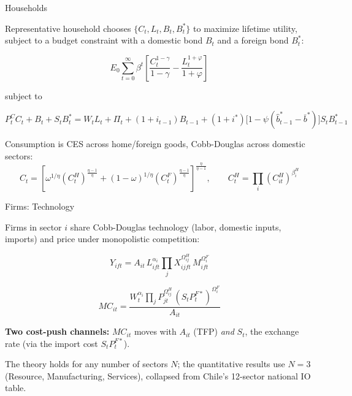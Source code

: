 \documentclass[aspectratio=43, 10pt]{beamer}
\begin{document}
\begin{frame}{Households}

\small

Representative household chooses $\{C_t,L_t,B_t,B_t^*\}$ to maximize lifetime utility, subject to a budget constraint with a domestic bond $B_t$ and a foreign bond $B_t^*$:

\[
E_0\sum_{t=0}^{\infty}\beta^t
\left[
\frac{C_t^{1-\gamma}}{1-\gamma}
-
\frac{L_t^{1+\varphi}}{1+\varphi}
\right]
\]

subject to 
\vspace{1pt}

\[
P_t^CC_t+B_t+S_tB_t^*=W_tL_t+\Pi_t+(1{+}i_{t-1})B_{t-1}+(1{+}i^*)\big[1-\psi(\hat b^*_{t-1}-\bar b^*)\big]S_tB_{t-1}^*
\]

\vspace{6pt}
Consumption is CES across home/foreign goods, Cobb-Douglas across domestic sectors:
\[
C_t=
\left[
\omega^{1/\eta}(C_t^H)^{\frac{\eta-1}{\eta}}
+
(1-\omega)^{1/\eta}(C_t^F)^{\frac{\eta-1}{\eta}}
\right]^{\frac{\eta}{\eta-1}},
\qquad
C_t^H=\prod_i(C_{it}^H)^{\beta_i^H}
\]

\end{frame}


\begin{frame}{Firms: Technology}

\small

Firms in sector $i$ share Cobb-Douglas technology (labor, domestic inputs, imports) and price under monopolistic competition:

\[
Y_{ift}=A_{it}\,L_{ift}^{\alpha_i}\prod_j X_{ijft}^{\Omega^H_{ij}}\,M_{ift}^{\Omega^F_i}
\]

\vspace{1pt}

\[
MC_{it}=\frac{W_t^{\alpha_i}\prod_j P_{jt}^{\Omega^H_{ij}}\,(S_tP_t^{F*})^{\Omega^F_i}}{A_{it}}
\]


\vspace{6pt}
\textbf{Two cost-push channels:} $MC_{it}$ moves with $A_{it}$ (TFP) \emph{and} $S_t$, the exchange rate (via the import cost $S_tP_t^{F*}$).

\vspace{6pt}
The theory holds for any number of sectors $N$; the quantitative results use $N=3$ (Resource, Manufacturing, Services), collapsed from Chile's 12-sector national IO table.

\end{frame}
\end{document}
